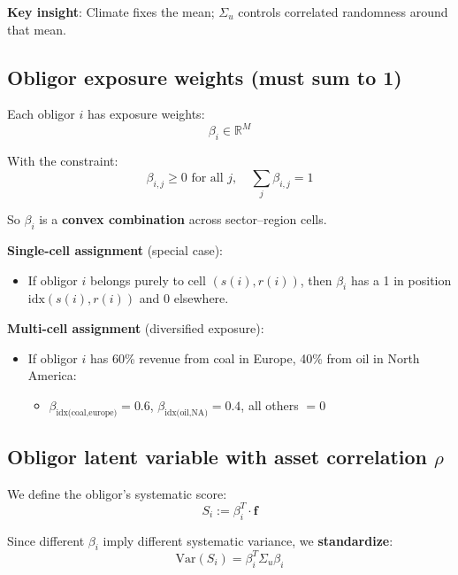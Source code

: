 \documentclass[11pt,a4paper]{article}
\begin{document}
\textbf{Key insight}: Climate fixes the mean; $\Sigma_u$ controls correlated randomness around that mean.

\subsection{Obligor exposure weights (must sum to 1)}

Each obligor $i$ has exposure weights:
\begin{equation}
\beta_i \in \mathbb{R}^M
\end{equation}

With the constraint:
\begin{equation}
\beta_{i,j} \geq 0 \text{ for all } j, \quad \sum_j \beta_{i,j} = 1
\end{equation}

So $\beta_i$ is a \textbf{convex combination} across sector--region cells.

\textbf{Single-cell assignment} (special case):
\begin{itemize}
    \item If obligor $i$ belongs purely to cell $(s(i), r(i))$, then $\beta_i$ has a 1 in position $\text{idx}(s(i),r(i))$ and 0 elsewhere.
\end{itemize}

\textbf{Multi-cell assignment} (diversified exposure):
\begin{itemize}
    \item If obligor $i$ has 60\% revenue from coal in Europe, 40\% from oil in North America:
    \begin{itemize}
        \item $\beta_{\text{idx(coal,europe)}} = 0.6$, $\beta_{\text{idx(oil,NA)}} = 0.4$, all others $= 0$
    \end{itemize}
\end{itemize}

\subsection{Obligor latent variable with asset correlation $\rho$}

We define the obligor's systematic score:
\begin{equation}
S_i := \beta_i^T \cdot \mathbf{f}
\end{equation}

Since different $\beta_i$ imply different systematic variance, we \textbf{standardize}:
\begin{equation}
\text{Var}(S_i) = \beta_i^T \Sigma_u \beta_i
\end{equation}
\end{document}
